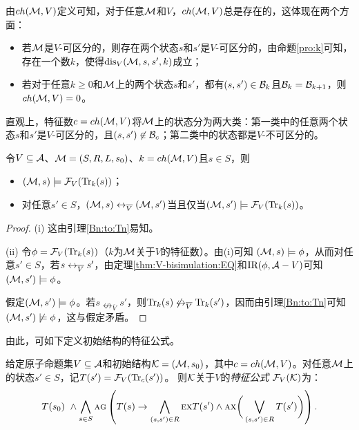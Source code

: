 由$ch({\cal M},V)$定义可知，对于任意${\cal M}$和$V$，$ch({\cal M},V)$总是存在的，这体现在两个方面：
\begin{itemize}
	\item[(1)] 若${\cal M}$是$V$-可区分的，则存在两个状态$s$和$s'$是$V$-可区分的，由命题\ref{pro:k}可知，存在一个数$k$，使得$\textrm{dis}_V({\cal M},s,s',k)$成立；
	\item[(2)] 若对于任意$k\geq 0$和${\cal M}$上的两个状态$s$和$s'$，都有$(s,s')\in {\cal B}_k$且${\cal B}_k ={\cal B}_{k+1}$，则$ch({\cal M},V)=0$。
\end{itemize}

直观上，特征数$c=ch({\cal M},V)$将${\cal M}$上的状态分为两大类：第一类中的任意两个状态$s$和$s'$是$V$-可区分的，且$(s,s')\not \in {\cal B}_c$；第二类中的状态都是$V$-不可区分的。%

\begin{lemma}\label{div_s}
	令$V\subseteq {\cal A}$、${\cal M}=(S,R,L,s_0)$、$k={ch({\cal M},V)}$且$s\in S$，则
	\begin{itemize}
		\item[(i)] $({\cal M}, s)\models {\cal F}_V(\textrm{Tr}_k(s))$；
		\item[(ii)] 对任意$s'\in S$，$({\cal M},s) \leftrightarrow_{\overline V} ({\cal M},s')$当且仅当$({\cal M},s')\models{\cal F}_V(\textrm{Tr}_k(s))$。
	\end{itemize}
\end{lemma}
\begin{proof}
	(i) 这由引理\ref{Bn:to:Tn}易知。
	
	(ii) 令$\phi = {\cal F}_V(\textrm{Tr}_k(s))$（$k$为${\cal M}$关于$V$的特征数）。由(i)可知 $({\cal M}, s) \models \phi$，从而对任意$s' \in S$，若$s \leftrightarrow_{\overline V} s'$，由定理\ref{thm:V-bisimulation:EQ}和$\textrm{IR}(\phi, {\cal A} - V)$可知$({\cal M}, s') \models \phi$。
	
	假定$({\cal M}, s')\models \phi$。若$s \nleftrightarrow_{\overline V} s'$，则$\textrm{Tr}_k(s) \not \leftrightarrow_{\overline V} \textrm{Tr}_k(s')$，因而由引理\ref{Bn:to:Tn}可知$({\cal M}, s')\not \models \phi$，这与假定矛盾。
\end{proof}

由此，可如下定义初始结构的特征公式。

\begin{definition}[特征公式]
	给定原子命题集$V\subseteq\cal A$和初始结构${\cal K}=({\cal M},s_0)$，其中$c=ch({\cal M},V)$。对任意${\cal M}$上的状态$s' \in S$，记$T(s') = {\cal F}_V(\textrm{Tr}_c(s'))$。
	则$\cal K$关于$V$的{\em 特征公式} ${\cal F}_V({\cal K})$为：
	\[T(s_0) \text{ } \wedge \bigwedge_{s\in S}\textsc{a} \textsc{g}\left(
	T(s) \rightarrow
	\bigwedge_{(s,s')\in R}
	\textsc{e} \textsc{x} T(s')
	\wedge
	\textsc{a} \textsc{x} \bigg(\bigvee_{(s,s')\in R}T(s')\bigg)
	\right).
	\]
	
\end{definition}

